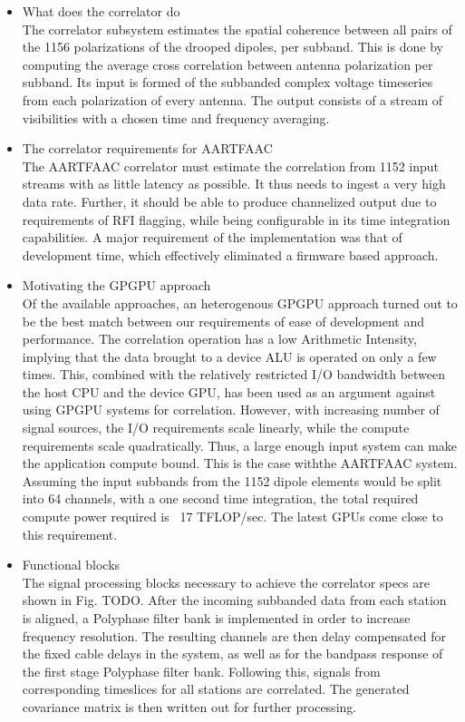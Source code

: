 \documentclass{ws-jai}
\begin{document}
\begin {itemize}
\item What does the correlator do\\
The correlator  subsystem estimates the  spatial coherence between all  pairs of
the 1156  polarizations of the  drooped dipoles, per  subband.  This is  done by
computing  the  average  cross  correlation  between  antenna  polarization  per
subband. Its  input is formed of  the subbanded complex voltage  timeseries from
each  polarization  of every  antenna.   The  output  consists  of a  stream  of
visibilities with a chosen time and  frequency averaging.

\item The correlator  requirements for AARTFAAC \\ 
The AARTFAAC  correlator must estimate  the correlation from 1152  input streams
with as  little latency as possible.  It thus needs  to ingest a very  high data
rate.  Further,  it  should  be  able  to  produce  channelized  output  due  to
requirements of RFI  flagging, while being configurable in  its time integration
capabilities.  A major requirement of the implementation was that of development
time, which effectively eliminated a firmware based approach.

\item Motivating the GPGPU approach\\
Of the available approaches, an heterogenous GPGPU approach turned out to be the
best match between our requirements of  ease of development and performance. The
correlation operation  has a  low Arithmetic Intensity,  implying that  the data
brought to a device ALU is operated on only a few times. This, combined with the
relatively restricted I/O bandwidth between the host CPU and the device GPU, has
been used as  an argument against using GPGPU systems  for correlation. However,
with increasing number  of signal sources, the I/O  requirements scale linearly,
while the compute  requirements scale quadratically. Thus, a  large enough input
system can make the application compute bound. This is the case withthe AARTFAAC
system. Assuming the input subbands from the 1152 dipole elements would be split
into 64 channels, with a one second time integration, the total required compute
power required is ~17 TFLOP/sec. The latest GPUs come close to this requirement.

\item Functional blocks \\
The signal processing blocks necessary to achieve the correlator specs are shown
in Fig. TODO.  After the incoming subbanded data from each station is aligned, a
Polyphase filter bank is implemented  in order to increase frequency resolution.
The resulting channels are then delay  compensated for the fixed cable delays in
the system, as  well as for the  bandpass response of the  first stage Polyphase
filter  bank.  Following  this, signals  from corresponding  timeslices for  all
stations are correlated. The generated covariance matrix is then written out for
further processing.
\end {itemize}
\end{document}
